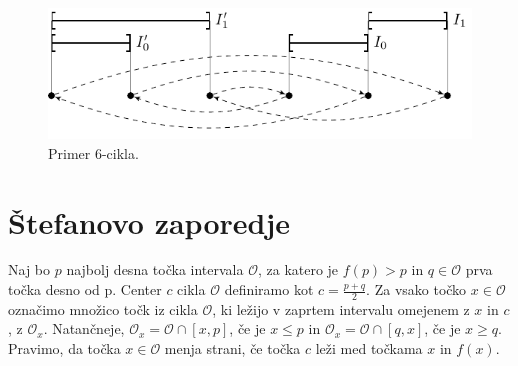 \documentclass[mat2]{fmfdelo}
\begin{document}
\begin{primer}[6-cikel]
\begin{figure}[h]
  \centering
  \includegraphics{images/sestcikel.pdf}
  \caption[Primer vektorske slike.]{Primer 6-cikla.}
  \label{fig:6cikel}
\end{figure}
\end{primer}

\section{Štefanovo zaporedje}
\begin{definicija}
Naj bo $p$ najbolj desna točka intervala $\mathcal{O}$, za katero je $f(p) > p$ in $q\in \mathcal{O}$ prva točka desno od p. Center $c$ cikla $\mathcal{O}$ definiramo kot $c=\frac{p+q}{2}$. Za vsako točko $x \in \mathcal{O}$ označimo množico točk iz cikla $\mathcal{O}$, ki ležijo v zaprtem intervalu omejenem z $x$ in $c$, z $\mathcal{O}_x$. Natančneje, $\mathcal{O}_x = \mathcal{O} \cap [x, p]$, če je $x \leq p$ in  $\mathcal{O}_x = \mathcal{O} \cap [q, x]$, če je $x \geq q$. Pravimo, da točka $x \in \mathcal{O}$ menja strani, če točka $c$ leži med točkama $x$ in $f(x)$.
\end{definicija}
\end{document}
